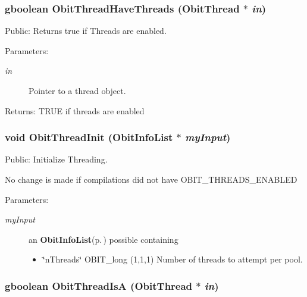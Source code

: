 \subsubsection{\setlength{\rightskip}{0pt plus 5cm}gboolean Obit\-Thread\-Have\-Threads ({\bf Obit\-Thread} $\ast$ {\em in})}\label{ObitThread_8h_a17}


Public: Returns true if Threads are enabled. 

\begin{Desc}
\item[Parameters:]
\begin{description}
\item[{\em in}]Pointer to a thread object. \end{description}
\end{Desc}
\begin{Desc}
\item[Returns:]TRUE if threads are enabled \end{Desc}
\subsubsection{\setlength{\rightskip}{0pt plus 5cm}void Obit\-Thread\-Init ({\bf Obit\-Info\-List} $\ast$ {\em my\-Input})}\label{ObitThread_8h_a18}


Public: Initialize Threading. 

No change is made if compilations did not have OBIT\_\-THREADS\_\-ENABLED \begin{Desc}
\item[Parameters:]
\begin{description}
\item[{\em my\-Input}]an {\bf Obit\-Info\-List}{\rm (p.\,\pageref{structObitInfoList})} possible containing \begin{itemize}
\item \char`\"{}n\-Threads\char`\"{} OBIT\_\-long (1,1,1) Number of threads to attempt per pool. \end{itemize}
\end{description}
\end{Desc}
\subsubsection{\setlength{\rightskip}{0pt plus 5cm}gboolean Obit\-Thread\-Is\-A ({\bf Obit\-Thread} $\ast$ {\em in})}\label{ObitThread_8h_a16}



